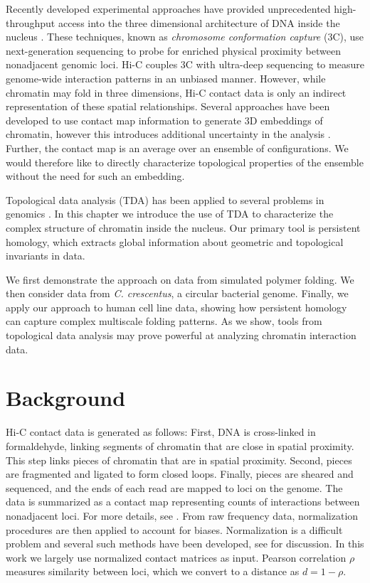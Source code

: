 Recently developed experimental approaches have provided unprecedented high-throughput access into the three dimensional architecture of DNA inside the nucleus \cite{LiebermanAiden:2009jz,Dekker:2013hi,Ay:2015gv}.
These techniques, known as \emph{chromosome conformation capture} (3C), use next-generation sequencing to probe for enriched physical proximity between nonadjacent genomic loci.
Hi-C couples 3C with ultra-deep sequencing to measure genome-wide interaction patterns in an unbiased manner.
However, while chromatin may fold in three dimensions, Hi-C contact data is only an indirect representation of these spatial relationships.
Several approaches have been developed to use contact map information to generate 3D embeddings of chromatin, however this introduces additional uncertainty in the analysis \cite{Ay:2015gv}.
Further, the contact map is an average over an ensemble of configurations.
We would therefore like to directly characterize topological properties of the ensemble without the need for such an embedding.

Topological data analysis (TDA) has been applied to several problems in genomics \cite{Chan:2013,Emmett:2014a}.
In this chapter we introduce the use of TDA to characterize the complex structure of chromatin inside the nucleus.
Our primary tool is persistent homology, which extracts global information about geometric and topological invariants in data.

We first demonstrate the approach on data from simulated polymer folding.
We then consider data from \emph{C. crescentus}, a circular bacterial genome.
Finally, we apply our approach to human cell line data, showing how persistent homology can capture complex multiscale folding patterns.
As we show, tools from topological data analysis may prove powerful at analyzing chromatin interaction data.

\section{Background}
\label{sec:background}
%
Hi-C contact data is generated as follows:
First, DNA is cross-linked in formaldehyde, linking segments of chromatin that are close in spatial proximity.
This step links pieces of chromatin that are in spatial proximity.
Second, pieces are fragmented and ligated to form closed loops.
Finally, pieces are sheared and sequenced, and the ends of each read are mapped to loci on the genome.
The data is summarized as a contact map representing counts of interactions between nonadjacent loci.
For more details, see \cite{Dekker:2013hi}.
From raw frequency data, normalization procedures are then applied to account for biases.
Normalization is a difficult problem and several such methods have been developed, see \cite{Ay:2015gv} for discussion.
In this work we largely use normalized contact matrices as input.
Pearson correlation $\rho$ measures similarity between loci, which we convert to a distance as $d=1-\rho$.

